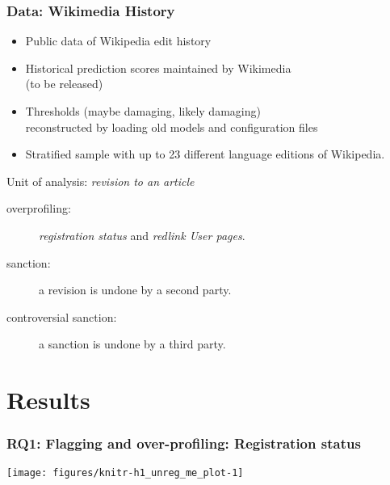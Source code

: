 \documentclass[10pt,xcolor=dvipsnames,aspectratio=169]{beamer}\usepackage[]{graphicx}\usepackage[]{color}
\makeatletter
\def\maxwidth{ %
  \ifdim\Gin@nat@width>\linewidth
    \linewidth
  \else
    \Gin@nat@width
  \fi
}
\newenvironment{knitrout}{}{} %
\makeatother
\begin{document}
\begin{frame}\frametitle{Data: Wikimedia History}

\larger


\begin{itemize}
\item Public data of Wikipedia edit history
\item Historical prediction scores maintained by Wikimedia \\ (to be released)
\item Thresholds (\textcolor{maybebad}{maybe damaging}, \textcolor{likelybad}{likely damaging})\\ reconstructed by loading old models and configuration files
\item Stratified sample with up to 23 different language editions of Wikipedia.
\end{itemize}

Unit of analysis: \emph{revision to an article}

\begin{description}

\item[overprofiling:] \emph{registration status} and \emph{redlink User pages}.
\item[sanction:] a revision is undone by a second party.
\item[controversial sanction:] a sanction is undone by a third party.

\end{description}

\end{frame}

\section{Results}

\begin{frame}
  \sectionpage
  \end{frame}

\begin{frame}\frametitle{RQ1: Flagging and over-profiling: Registration status}

\begin{knitrout}
\color{fgcolor}
\texttt{[image: figures/knitr-h1\_unreg\_me\_plot-1]} 

\end{knitrout}
\end{frame}
\end{document}
